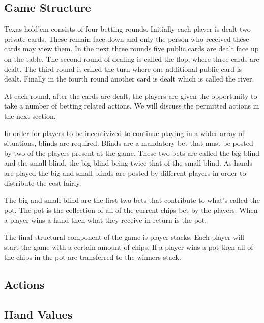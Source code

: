 \subsection{Game Structure}\label{subsec:bettingRounds}
Texas hold'em consists of four betting rounds.
Initially each player is dealt two private cards.
These remain face down and only the person who received these cards may view them.
In the next three rounds five public cards are dealt face up on the table.
The second round of dealing is called the flop, where three cards are dealt.
The third round is called the turn where one additional public card is dealt.
Finally in the fourth round another card is dealt which is called the river.

At each round, after the cards are dealt, the players are given the opportunity to take a number of betting
related actions.
We will discuss the permitted actions in the next section.

In order for players to be incentivized to continue playing in a wider array of situations, blinds are required.
Blinds are a mandatory bet that must be posted by two of the players present at the game.
These two bets are called the big blind and the small blind, the big blind being twice that of the small blind.
As hands are played the big and small blinds are posted by different players in order to distribute the cost fairly.

The big and small blind are the first two bets that contribute to what's called the pot.
The pot is the collection of all of the current chips bet by the players.
When a player wins a hand then what they receive in return is the pot.

The final structural component of the game is player stacks.
Each player will start the game with a certain amount of chips.
If a player wins a pot then all of the chips in the pot are transferred to the winners stack.

\subsection{Actions}\label{subsec:actions}

\subsection{Hand Values}\label{subsec:handValues}

